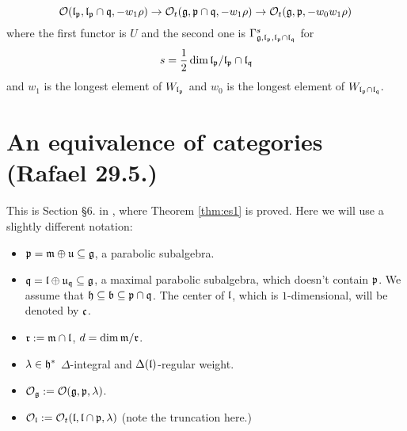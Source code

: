 \documentclass[a4paper,10pt]{article}
\begin{document}
\begin{theorem}[ES2]
\label{thm:es2}
 \[
  \mathcal{O} (\mathfrak{l}_{\mathfrak{p}}, \mathfrak{l}_{\mathfrak{p}} \cap \mathfrak{q}, -w_1 \rho) \to \mathcal{O}_t (\mathfrak{g}, \mathfrak{p} \cap \mathfrak{q}, -w_1 \rho) \to  \mathcal{O}_t (\mathfrak{g}, \mathfrak{p}, -w_0w_1 \rho)
 \]
 where the first functor is $U$ and the second one is $\Gamma^s_{\mathfrak{g}, \mathfrak{l}_{\mathfrak{p}}, \mathfrak{l}_{\mathfrak{p}} \cap \mathfrak{l}_{\mathfrak{q}}}$ for 
 \[
s = \frac{1}{2} \dim \mathfrak{l}_{\mathfrak{p}} /   \mathfrak{l}_{\mathfrak{p}} \cap \mathfrak{l}_{\mathfrak{q}}
 \]
 and $w_1$ is the longest element of $W_{\mathfrak{l}_{\mathfrak{p}}}$ and $w_0$ is the longest element of $W_{  \mathfrak{l}_{\mathfrak{p}} \cap \mathfrak{l}_{\mathfrak{q}}}.$

\end{theorem}



\section{An equivalence of categories (Rafael 29.5.)}

This is Section \S 6. in \cite{es}, where Theorem \ref{thm:es1} is proved. Here we will use a slightly different notation:
\begin{itemize}
\item $\mathfrak{p} =  \mathfrak{m} \oplus \mathfrak{u} \subseteq \mathfrak{g}$, a parabolic subalgebra.

\item $\mathfrak{q} =  \mathfrak{l} \oplus \mathfrak{u}_{\mathfrak{q}} \subseteq \mathfrak{g}$, a maximal parabolic subalgebra, which doesn't contain $\mathfrak{p}$. We assume that $\mathfrak{h} \subseteq \mathfrak{b} \subseteq \mathfrak{p} \cap \mathfrak{q}$. The center of $\mathfrak{l}$, which is  $1$-dimensional, will be denoted by $\mathfrak{c}$.

\item $\mathfrak{r}:=\mathfrak{m} \cap \mathfrak{l}$, $d=\dim \mathfrak{m}/\mathfrak{r}$.

\item $\lambda \in \mathfrak{h}^\ast$ $\Delta$-integral and $\Delta(\mathfrak{l})$-regular weight.

\item $\mathcal{O}_{\mathfrak{g}} := \mathcal{O}(\mathfrak{g},\mathfrak{p},\lambda)$.

\item $\mathcal{O}_{\mathfrak{l}} := \mathcal{O}_t(\mathfrak{l},\mathfrak{l\cap p},\lambda)$ (note the truncation here.)

\end{itemize}
\end{document}

